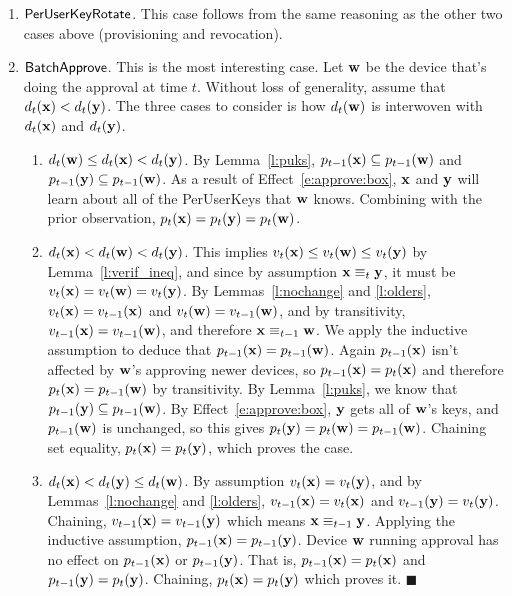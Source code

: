 \begin{enumerate}
 \item $\mathsf{PerUserKeyRotate}{}$.
  This case follows from the same reasoning as the other two cases above (provisioning and revocation).

 \item $\mathsf{BatchApprove}${}.
 This is the most interesting case. Let $\mathbf{w}$ be the device that’s doing
 the approval at time $t$. Without loss of generality, assume that 
 $d_{t}(\mathbf{x}) < d_{t}(\mathbf{y})$. The three cases to consider is how 
 $d_{t}(\mathbf{w})$ is interwoven with $d_{t}(\mathbf{x})$ and $d_{t}(\mathbf{y})$.
 \begin{enumerate}
   \item $d_{t}(\mathbf{w}) \le d_{t}(\mathbf{x}) < d_{t}(\mathbf{y})$. By Lemma~\ref{l:puks},
    $p_{t-1}(\mathbf{x}) \subseteq p_{t-1}(\mathbf{w})$ and $p_{t-1}(\mathbf{y}) \subseteq p_{t-1}(\mathbf{w})$.
    As a result of Effect~\ref{e:approve:box}, $\mathbf{x}$ and $\mathbf{y}$ will
    learn about all of the PerUserKeys that $\mathbf{w}$ knows. Combining with the prior
    observation, $p_{t}(\mathbf{x}) = p_{t}(\mathbf{y}) = p_{t}(\mathbf{w})$.
   \item $d_{t}(\mathbf{x}) < d_{t}(\mathbf{w}) < d_{t}(\mathbf{y})$.
   This implies $v_{t}(\mathbf{x}) \leq v_{t}(\mathbf{w}) \leq v_{t}(\mathbf{y})$ by Lemma~\ref{l:verif_ineq},
   and since by assumption $\mathbf{x} \equiv_{t} \mathbf{y}$, it must be $v_{t}(\mathbf{x}) = v_{t}(\mathbf{w})
   = v_{t}(\mathbf{y})$. By Lemmas~\ref{l:nochange} and \ref{l:olders},  
   $v_{t}(\mathbf{x}) = v_{t-1}(\mathbf{x})$ and 
   $v_{t}(\mathbf{w}) = v_{t-1}(\mathbf{w})$, and by transitivity, 
   $v_{t-1}(\mathbf{x}) = v_{t-1}(\mathbf{w})$, and therefore 
   $\mathbf{x} \equiv_{t-1} \mathbf{w}$. We apply the inductive assumption to deduce 
   that $p_{t-1}(\mathbf{x}) = p_{t-1}(\mathbf{w})$. 
   Again $p_{t-1}(\mathbf{x})$ isn’t affected by $\mathbf{w}$’s approving newer devices,
   so $p_{t-1}(\mathbf{x}) = p_{t}(\mathbf{x})$ and therefore 
   $p_{t}(\mathbf{x}) = p_{t-1}(\mathbf{w})$ by transitivity. 
   By Lemma~\ref{l:puks}, we know that $p_{t-1}(\mathbf{y}) \subseteq p_{t-1}(\mathbf{w})$.
   By Effect~\ref{e:approve:box}, $\mathbf{y}$ gets all of $\mathbf{w}$’s keys, 
   and $p_{t-1}(\mathbf{w})$ is unchanged, so this gives 
   $p_{t}(\mathbf{y}) = p_{t}(\mathbf{w}) = p_{t-1}(\mathbf{w})$. Chaining set equality, 
   $p_{t}(\mathbf{x}) = p_{t}(\mathbf{y})$, which proves the case.
   \item $d_{t}(\mathbf{x}) < d_{t}(\mathbf{y}) \le d_{t}(\mathbf{w})$.
   By assumption $v_{t}(\mathbf{x}) = v_{t}(\mathbf{y})$, and by Lemmas~\ref{l:nochange} and \ref{l:olders},
   $v_{t-1}(\mathbf{x}) = v_{t}(\mathbf{x})$ and $v_{t-1}(\mathbf{y}) = v_{t}(\mathbf{y})$.
   Chaining, $v_{t-1}(\mathbf{x}) = v_{t-1}(\mathbf{y})$ which means
   $\mathbf{x} \equiv_{t-1} \mathbf{y}$. Applying the inductive assumption,
   $p_{t-1}(\mathbf{x}) = p_{t-1}(\mathbf{y})$.
   Device $\mathbf{w}$ running approval has no effect on $p_{t-1}(\mathbf{x})$
   or $p_{t-1}(\mathbf{y})$. That is, $p_{t-1}(\mathbf{x}) = p_{t}(\mathbf{x})$ 
   and $p_{t-1}(\mathbf{y}) = p_{t}(\mathbf{y})$. Chaining,
   $p_{t}(\mathbf{x}) = p_{t}(\mathbf{y})$ which proves it. $\blacksquare$

 \end{enumerate}


\end{enumerate}
